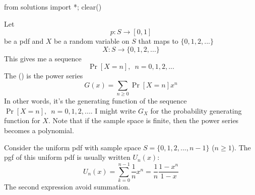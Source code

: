 \begin{python0}
from solutions import *; clear()
\end{python0}

Let
\[
p: S \rightarrow [0,1]
\]
be a pdf
and $X$ be a random variable on $S$ that maps to $\{0, 1, 2, ...\}$
\[
X: S \rightarrow \{0, 1, 2, ...\}
\]
This gives me a sequence
\[
\Pr[X = n], \,\,\, n = 0, 1, 2, ...
\]
The
()
is the power series
\[
G(x) = \sum_{n \geq 0} \Pr[X = n] x^n
\]
In other words, it's the generating function of the sequence
$\Pr[X = n], \,\,\, n = 0, 1, 2, ...$.
I might write $G_X$ for the probability generating function for $X$.
Note that if the sample space is finite, then the
power series becomes a polynomial.



Consider the uniform pdf with sample space $S = \{0, 1, 2, ..., n - 1\}$
($n \geq 1$).
The pgf of this uniform pdf is usually written $U_n(x)$:
\[
U_n(x) = \sum_{k = 0}^{n - 1} \frac{1}{n} x^n = \frac{1}{n} \frac{1 - x^n}{1 - x}
\]
The second expression avoid summation.

